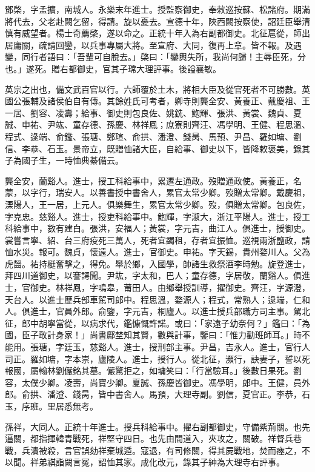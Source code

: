 \begin{pinyinscope}
鄧棨，字孟擴，南城人。永樂末年進士。授監察御史，奉敕巡按蘇、松諸府。期滿將代去，父老赴闕乞留，得請。旋以憂去。宣德十年，陜西闕按察使，詔廷臣舉清慎有威望者。楊士奇薦棨，遂以命之。正統十年入為右副都御史。北征扈從，師出居庸關，疏請回鑾，以兵事專屬大將。至宣府、大同，復再上章。皆不報。及遇變，同行者語曰：「吾輩可自脫去。」棨曰：「鑾輿失所，我尚何歸！主辱臣死，分也。」遂死。贈右都御史，官其子瑺大理評事。後謚襄敏。

英宗之出也，備文武百官以行。六師覆於土木，將相大臣及從官死者不可勝數。英國公張輔及諸侯伯自有傳。其餘姓氏可考者，卿寺則龔全安、黃養正、戴慶祖、王一居、劉容、凌壽；給事、御史則包良佐、姚銑、鮑輝、張洪、黃裳、魏貞、夏誠、申祐、尹竑、童存德、孫慶、林祥鳳；庶寮則齊汪、馮學明、王健、程思溫、程式、逯端、俞鑑、張瑭、鄭瑄、俞拱、潘澄、錢昺、馬預、尹昌、羅如墉、劉信、李恭、石玉。景帝立，既贈恤諸大臣，自給事、御史以下，皆降敕褒美，錄其子為國子生，一時恤典綦備云。

龔全安，蘭谿人。進士，授工科給事中，累遷左通政。歿贈通政使。黃養正，名蒙，以字行，瑞安人。以善書授中書舍人，累官太常少卿。歿贈太常卿。戴慶祖，溧陽人，王一居，上元人。俱樂舞生，累官太常少卿。歿，俱贈太常卿。包良佐，字克忠。慈谿人。進士，授吏科給事中。鮑輝，字淑大，浙江平陽人。進士，授工科給事中，數有建白。張洪，安福人；黃裳，字元吉，曲江人。俱進士，授御史。裳嘗言寧、紹、台三府疫死三萬人，死者宜蠲租，存者宜振恤。巡視兩浙鹽政，請恤水災。報可。魏貞，懷遠人。進士，官御史。申祐。字天錫，貴州婺川人。父為虎齧。祐持梃奮擊之，得免。舉於鄉，入國學，帥諸生救祭酒李時勉。旋登進士，拜四川道御史，以謇諤聞。尹竑，字太和，巴人；童存德，字居敬，蘭谿人。俱進士，官御史。林祥鳳，字鳴皋，莆田人。由鄉舉授訓導，擢御史。齊汪，字源澄，天台人。以進士歷兵部車駕司郎中。程思溫，婺源人；程式，常熟人；逯端，仁和人。俱進士，官員外郎。俞鑒，字元吉，桐廬人。以進士授兵部職方司主事。駕北征，郎中胡寧當從，以病求代，鑑慷慨許諾。或曰：「家遠子幼奈何？」鑑曰：「為國，臣子敢計身家！」尚書鄺埜知其賢，數與計事，鑒曰：「惟力勸班師耳。」時不能用。張瑭，字廷玉，慈谿人。進士，授刑部主事。尹昌，吉永人。進士，官行人司正。羅如墉，字本崇，廬陵人。進士，授行人。從北征，瀕行，訣妻子，誓以死報國，屬翰林劉儼銘其墓。儼驚拒之，如墉笑曰：「行當驗耳。」後數日果死。劉容，太僕少卿。凌壽，尚寶少卿。夏誠、孫慶皆御史。馮學明，郎中。王健，員外郎。俞拱、潘澄、錢昺，皆中書舍人。馬預，大理寺副。劉信，夏官正。李恭，石玉，序班。里居悉無考。

孫祥，大同人。正統十年進士。授兵科給事中。擢右副都御史，守備紫荊關。也先逼關，都指揮韓青戰死，祥堅守四日。也先由間道入，夾攻之，關破。祥督兵巷戰，兵潰被殺，言官誤劾祥棄城遁。寇退，有司修關，得其屍戰地，焚而瘞之，不以聞。祥弟祺詣闕言冤，詔恤其家。成化改元，錄其子紳為大理寺右評事。


\end{pinyinscope}

